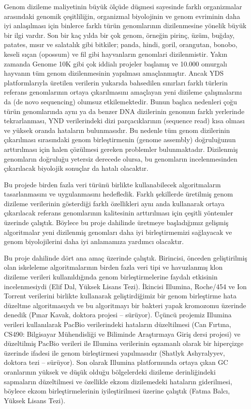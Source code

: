 \documentclass[11pt]{article}
\begin{document}
Genom dizileme maliyetinin büyük ölçüde düşmesi sayesinde farklı organizmalar arasındaki genomik çeşitliliğin, organizmal biyolojinin ve genom evriminin daha iyi anlaşılması için binlerce farklı türün genomlarının dizilenmesine yönelik büyük bir ilgi vardır. Son bir kaç yılda bir çok genom, örneğin pirinç, üzüm, buğday, patates, mısır ve salatalık gibi bitkiler; panda, hindi, goril, orangutan, bonobo, keseli sıçan (opossum) ve fil gibi hayvanların genomlari dizilenmistir. Yakın zamanda Genome 10K gibi çok iddialı projeler başlamış ve 10.000 omurgalı hayvanın tüm genom dizilenmesinin yapılması amaçlanmıştır. Ancak YDS platformlarıyla üretilen verilerin yukarıda bahsedilen sınırları farklı türlerin referans genomlarının ortaya çıkarılmasını amaçlayan yeni dizileme çalışmalarını da (de novo sequencing) olumsuz etkilemektedir. Bunun başlıca nedenleri çoğu türün genomlarında aynı ya da benzer DNA dizilerinin genomun farklı yerlerinde tekrarlanması, YND verilerindeki dizi parçacıklarının (sequence read) kısa olması ve yüksek oranda hataların bulunmasıdır. Bu nedenle tüm genom dizilerinin çıkarılması sırasındaki genom birleştirmenin (genome assembly) doğruluğunun arttırılması için halen çözülmesi gereken problemler bulunmaktadır. Dizilenmiş genomların doğruluğu yetersiz derecede olursa, bu genomların incelenmesinden çıkarılacak biyolojik sonuçlar da hatalı olacaktır.

Bu projede birden fazla veri türünü birlikte kullanabilecek algoritmaların tasarlanmasını ve uygulanmasını hedefledik. Farklı şekillerde üretilmiş genom dizileme verilerinin gösterdiği farklı özellikleri aynı anda kullanarak ortaya çıkarılacak referans genomlarının kalitesinin arttırılması için çeşitli yöntemler üzerinde çalıştık. Böylece bu proje dahilinde üretmeye başladığımız gelişmiş algoritmalar yeni dizilenmiş genomları daha iyi birleştirmemizi sağlayacak ve genom biyolojilerini daha iyi anlamamıza yardımcı olacaktır. 

Bu proje dahilinde dört ana amaç üzerinde çalıştık. 
Birincisi, önceden geliştirilmiş olan iskeleleme algoritmalarının birden fazla veri tipi ve havuzlanmış klon dizileme verileri kullanıldığında genom birleştirmelerine faydalı etkisinin incelenmesiydi (Elif Dal, Yüksek Lisans Tezi). İkincisi Illumina, Roche/454 ve Ion Torrent verilerini birlikte kullanarak geliştirdiğimiz bir genom birleştirme hata düzeltme algoritmasıydı ve bu algoritmayı bir bakteri yapak kromozomu üzerinde denedik (Pınar Kavak, doktora projesi -- sürüyor).
Üçüncü projemiz Illumina verileri kullanılarak PacBio verilerindeki hataların düzeltilmesi (Can Fırtına, CS490: Bilgisayar Mühendisliği ve Biliminde Araştırmaya Giriş dersi projesi) ve düzeltilmiş PacBio verileri ile Illumina verilerinin eşzamanlı olarak bir hiperçizge üzerinde ifadesi ile genom birleştirmesi yapılmasıdır (Shatlyk Ashyralyyev, doktora tezi -- sürüyor). Son olarak Illumina platformunda ortaya çıkan GC oranlarının yüksek ve düşük olduğu bölgelerdeki dizileme derinliğindeki sapmaların düzeltilmesi ve özellikle ekzom dizilemedeki hataların giderilmesi, böylece ekzom birleştirmelerinin iyileştirilmesi üzerine çalıştık (Fatma Balcı, Yüksek Lisans Tezi). 
\end{document}
